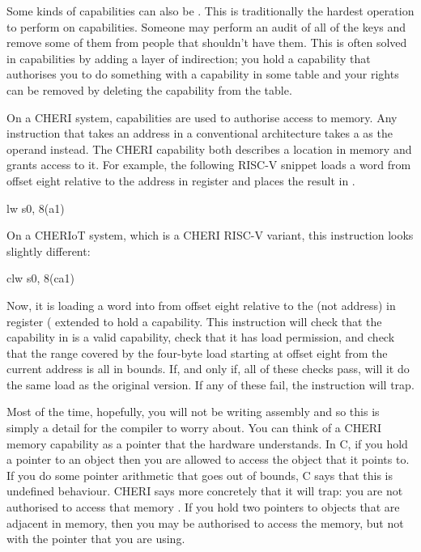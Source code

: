 Some kinds of capabilities can also be .
This is traditionally the hardest operation to perform on capabilities.
Someone may perform an audit of all of the keys and remove some of them from people that shouldn't have them.
This is often solved in capabilities by adding a layer of indirection; you hold a capability that authorises you to do something with a capability in some table and your rights can be removed by deleting the capability from the table.


On a CHERI system, capabilities are used to authorise access to memory.
Any instruction that takes an address in a conventional architecture takes a  as the operand instead.
The CHERI capability both describes a location in memory and grants access to it.
For example, the following RISC-V snippet loads a word from offset eight relative to the address in register  and places the result in .

\begin{asmsnippet}
	lw	s0, 8(a1)
\end{asmsnippet}

On a CHERIoT system, which is a CHERI RISC-V variant, this instruction looks slightly different:

\begin{asmsnippet}
	clw	s0, 8(ca1)
\end{asmsnippet}

Now, it is loading a word into  from offset eight relative to the  (not address) in register  ( extended to hold a capability.
This instruction will check that the capability in  is a valid capability, check that it has load permission, and check that the range covered by the four-byte load starting at offset eight from the current address is all in bounds.
If, and only if, all of these checks pass, will it do the same load as the original version.
If any of these fail, the instruction will trap.


Most of the time, hopefully, you will not be writing assembly and so this is simply a detail for the compiler to worry about.
You can think of a CHERI memory capability as a pointer that the hardware understands.
In C, if you hold a pointer to an object then you are allowed to access the object that it points to.
If you do some pointer arithmetic that goes out of bounds, C says that this is undefined behaviour.
CHERI says more concretely that it will trap: you are not authorised to access that memory .
If you hold two pointers to objects that are adjacent in memory, then you may be authorised to access the memory, but not with the pointer that you are using.

